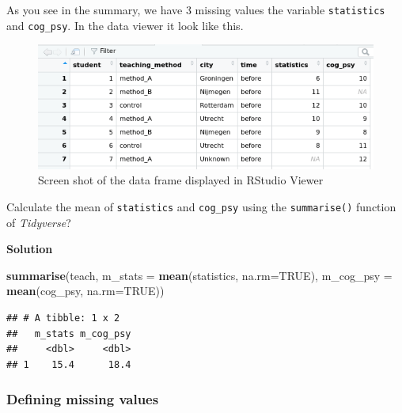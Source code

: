 \documentclass[
]{scrartcl}
\makeatletter
\newenvironment{Shaded}{\begin{snugshade}}{\end{snugshade}}
\newcommand{\AttributeTok}[1]{\textcolor[rgb]{0.13,0.29,0.53}{#1}}
\newcommand{\ConstantTok}[1]{\textcolor[rgb]{0.56,0.35,0.01}{#1}}
\newcommand{\FunctionTok}[1]{\textcolor[rgb]{0.13,0.29,0.53}{\textbf{#1}}}
\newcommand{\NormalTok}[1]{#1}
\newenvironment{kframe}{%
\medskip{}
\setlength{\fboxsep}{.8em}
 \def\at@end@of@kframe{}%
 \ifinner\ifhmode%
  \def\at@end@of@kframe{\end{minipage}}%
  \begin{minipage}{\columnwidth}%
 \fi\fi%
 \def\FrameCommand##1{\hskip\@totalleftmargin \hskip-\fboxsep
 \colorbox{shadecolor}{##1}\hskip-\fboxsep
     \hskip-\linewidth \hskip-\@totalleftmargin \hskip\columnwidth}%
 \MakeFramed {\advance\hsize-\width
   \@totalleftmargin\z@ \linewidth\hsize
   \@setminipage}}%
 {\par\unskip\endMakeFramed%
 \at@end@of@kframe}
\newenvironment{rmdblock}[1]
  {
  \begin{itemize}
  \renewcommand{\labelitemi}{
    \raisebox{-.7\height}[0pt][0pt]{
      {\setkeys{Gin}{width=3em,keepaspectratio}\texttt{[image: images/\#1]}}
    }
  }
  \setlength{\fboxsep}{1em}
  \begin{kframe}
  \item
  }
  {
  \end{kframe}
  \end{itemize}
  }
\newenvironment{myexercise}
    {\begin{rmdblock}{exercise_green}}
    {\end{rmdblock}}
\newenvironment{webexsolution}[1]
    {\par\tiny\textbf{#1}}
    {\par}
\newcommand{\webexhide}[1]{\begin{webexsolution}{#1}}
\newcommand{\webexunhide}{\end{webexsolution}}
\makeatother
\begin{document}
As you see in the summary, we have 3 missing values the variable \texttt{statistics} and \texttt{cog\_psy}. In the data viewer it look like this.

\begin{figure}

{\centering \includegraphics[width=500px]{images/missings_unknown} 

}

\caption{Screen shot of the data frame displayed in RStudio Viewer}\label{fig:missingsscreenshort}
\end{figure}

\begin{myexercise}
Calculate the mean of \texttt{statistics} and \texttt{cog\_psy} using
the \texttt{summarise()} function of \emph{Tidyverse}?
\end{myexercise}
\webexhide{Solution}

\begin{Shaded}
\begin{Highlighting}[]
\FunctionTok{summarise}\NormalTok{(teach, }\AttributeTok{m\_stats =} \FunctionTok{mean}\NormalTok{(statistics, }\AttributeTok{na.rm=}\ConstantTok{TRUE}\NormalTok{),}
          \AttributeTok{m\_cog\_psy =} \FunctionTok{mean}\NormalTok{(cog\_psy, }\AttributeTok{na.rm=}\ConstantTok{TRUE}\NormalTok{))}
\end{Highlighting}
\end{Shaded}

\begin{verbatim}
## # A tibble: 1 x 2
##   m_stats m_cog_psy
##     <dbl>     <dbl>
## 1    15.4      18.4
\end{verbatim}

\webexunhide

\hypertarget{defining-missing-values}{%
\subsubsection{Defining missing values}\label{defining-missing-values}}
\end{document}
